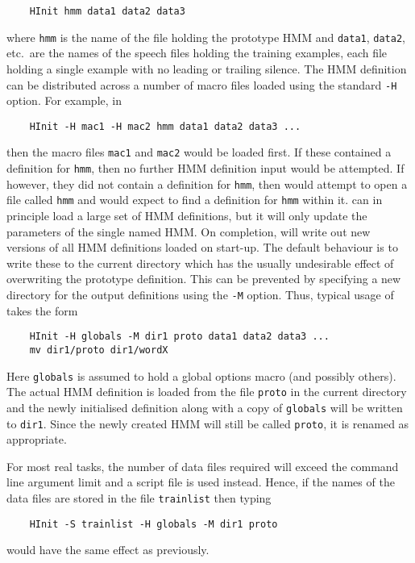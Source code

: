 \begin{verbatim}
    HInit hmm data1 data2 data3
\end{verbatim}
where \texttt{hmm} is the name of the file holding the prototype
HMM and \texttt{data1}, \texttt{data2}, etc.\  are the
names of the speech files holding the training examples, each file holding a single example
with no leading or trailing silence.  The HMM definition can be distributed across a number
of macro files loaded using the standard \texttt{-H} option.  For example, in
\begin{verbatim}
    HInit -H mac1 -H mac2 hmm data1 data2 data3 ...
\end{verbatim}
then the macro files \texttt{mac1} and \texttt{mac2} would be loaded first.  If these contained a
definition for \texttt{hmm}, then no further HMM definition input would be attempted.  If however,
they did not contain a definition for \texttt{hmm}, then  would attempt to open a file called
\texttt{hmm} and would expect to find a definition for \texttt{hmm} within it.   can in principle
load a large set of HMM definitions, but it will only update the parameters of the single named
HMM.  On completion,  will write out new versions of all HMM definitions loaded on start-up.
The default behaviour is to write these to the current directory which has the usually
undesirable effect of overwriting the prototype definition.  This can be prevented by
specifying a new directory for the output definitions using the \texttt{-M} option.
Thus, typical usage of  takes the form 
\begin{verbatim}
    HInit -H globals -M dir1 proto data1 data2 data3 ...
    mv dir1/proto dir1/wordX
\end{verbatim}
Here \texttt{globals} is assumed to hold a global 
options macro  (and possibly others).  
The actual HMM definition is loaded from the file \texttt{proto} in the current directory and
the newly initialised definition along with a copy of \texttt{globals} will be written to
\texttt{dir1}.  Since the newly created HMM will still be called \texttt{proto}, it is renamed
as appropriate.

For most real tasks, the number of data files required will 
exceed the command line argument
limit and a script file is used instead.  
Hence, if the names of the data files are stored in the file
\texttt{trainlist} then typing
\begin{verbatim}
    HInit -S trainlist -H globals -M dir1 proto
\end{verbatim}
would have the same effect as previously.

